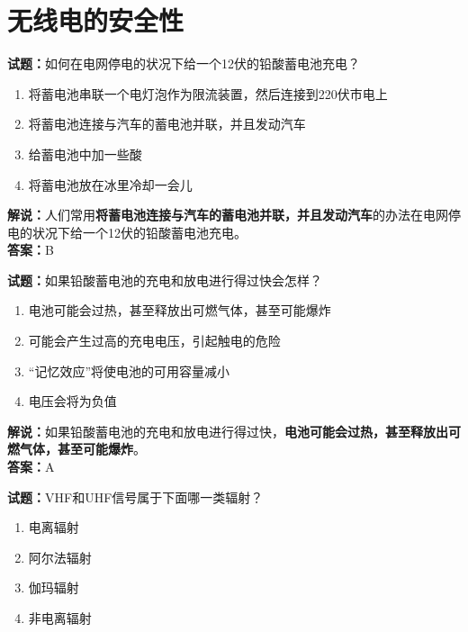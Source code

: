 \documentclass{ctexbook}
\begin{document}


\chapter{无线电的安全性}

\newpage

\noindent\textbf{试题：}如何在电网停电的状况下给一个\num{12}伏的铅酸蓄电池充电？

\begin{enumerate}[leftmargin=3em]
  \item 将蓄电池串联一个电灯泡作为限流装置，然后连接到\num{220}伏市电上
  \item 将蓄电池连接与汽车的蓄电池并联，并且发动汽车
  \item 给蓄电池中加一些酸
  \item 将蓄电池放在冰里冷却一会儿
\end{enumerate}

\noindent\textbf{解说：}人们常用\textbf{将蓄电池连接与汽车的蓄电池并联，并且发动汽车}的办法在电网停电的状况下给一个12伏的铅酸蓄电池充电。\\\noindent\textbf{答案：}B%

\vspace{\baselineskip}

\noindent\textbf{试题：}如果铅酸蓄电池的充电和放电进行得过快会怎样？

\begin{enumerate}[leftmargin=3em]
  \item 电池可能会过热，甚至释放出可燃气体，甚至可能爆炸
  \item 可能会产生过高的充电电压，引起触电的危险
  \item “记忆效应”将使电池的可用容量减小
  \item 电压会将为负值
\end{enumerate}

\noindent\textbf{解说：}如果铅酸蓄电池的充电和放电进行得过快，\textbf{电池可能会过热，甚至释放出可燃气体，甚至可能爆炸}。\\\noindent\textbf{答案：}A%

\vspace{\baselineskip}

\noindent\textbf{试题：}VHF和UHF信号属于下面哪一类辐射？

\begin{enumerate}[leftmargin=3em]
  \item 电离辐射
  \item 阿尔法辐射
  \item 伽玛辐射
  \item 非电离辐射
\end{enumerate}
\end{document}
